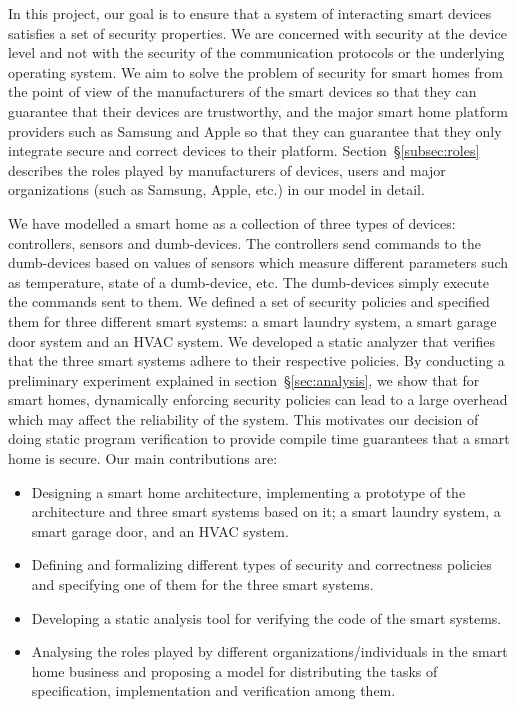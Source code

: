 \documentclass{article}
\begin{document}
In this project, our goal is to ensure that a system of interacting smart devices satisfies a set of security properties. We are concerned with security at the device level and not with the security of the communication protocols or the underlying operating system. We aim to solve the problem of security for smart homes from the point of view of the manufacturers of the smart devices so that they can guarantee that their devices are trustworthy, and the major smart home platform providers such as Samsung and Apple so that they can guarantee that they only integrate secure and correct devices to their platform. Section~\S\ref{subsec:roles} describes the roles played by manufacturers of devices, users and major organizations (such as Samsung, Apple, etc.) in our model in detail.

We have modelled a smart home as a collection of three types of devices: controllers, sensors and dumb-devices. The controllers send commands to the dumb-devices based on values of sensors which measure different parameters such as temperature, state of a dumb-device, etc. The dumb-devices simply execute the commands sent to them.
We defined a set of security policies and specified them for three different smart systems: a smart laundry system, a smart garage door system and an HVAC system. We developed a static analyzer that verifies that the three smart systems adhere to their respective policies. By conducting a preliminary experiment explained in section~\S\ref{sec:analysis}, we show that for smart homes, dynamically enforcing security policies can lead to a large overhead which may affect the reliability of the system. This motivates our decision of doing static program verification to provide compile time guarantees that a smart home is secure. Our main contributions are:
\begin{itemize}[topsep=0pt,itemsep=0ex,partopsep=1ex,parsep=1ex]
    \item Designing a smart home architecture, implementing a prototype of the architecture and three smart systems based on it; a smart laundry system, a smart garage door, and an HVAC system.    
    \item Defining and formalizing different types of security and correctness policies and specifying one of them for the three smart systems.
    \item Developing a static analysis tool for verifying the code of the smart systems.
    \item Analysing the roles played by different organizations/individuals in the smart home business and proposing a model for distributing the tasks of specification, implementation and verification among them.
\end{itemize}
  
\end{document}
